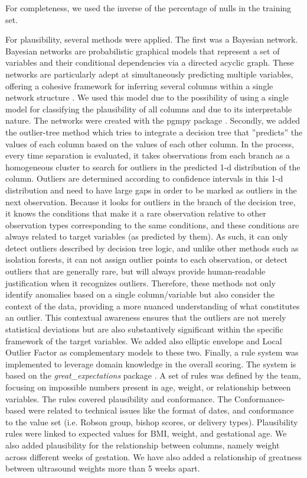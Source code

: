 For completeness, we used the inverse of the percentage of nulls in the training set. 

For plausibility, several methods were applied. The first was a Bayesian network. Bayesian networks are probabilistic graphical models that represent a set of variables and their conditional dependencies via a directed acyclic graph. These networks are particularly adept at simultaneously predicting multiple variables, offering a cohesive framework for inferring several columns within a single network structure \cite{pearl1988probabilistic}.
We used this model due to the possibility of using a single model for classifying the plausibility of all columns and due to its interpretable nature. The networks were created with the pgmpy package \cite{pgmpy}. Secondly, we added the outlier-tree method \cite{cortesExplainableOutlierDetection2020}which tries to integrate a decision tree that ”predicts” the values of each column based on the values of each other column. In the process, every time separation is evaluated, it takes observations from each branch as a homogeneous cluster to search for outliers in the predicted 1-d distribution of the column. Outliers are determined according to confidence intervals in this 1-d distribution and need to have large gaps in order to be marked as outliers in the next observation. Because it looks for outliers in the branch of the decision tree, it knows the conditions that make it a rare observation relative to other observation types corresponding to the same conditions, and these conditions are always related to target variables (as predicted by them). As such, it can only detect outliers described by decision tree logic, and unlike other methods such as isolation forests, it can not assign outlier points to each observation, or detect outliers that are generally rare, but will always provide human-readable justification when it recognizes outliers. Therefore, these methods not only identify anomalies based on a single column/variable but also consider the context of the data, providing a more nuanced understanding of what constitutes an outlier. This contextual awareness ensures that the outliers are not merely statistical deviations but are also substantively significant within the specific framework of the target variables. We added also elliptic envelope and Local Outlier Factor as complementary models to these two. Finally, a rule system was implemented to leverage domain knowledge in the overall scoring. The system is based on the \textit{great\_expectations} package \cite{GXProactiveCollaborative}. A set of rules was defined by the team, focusing on impossible numbers present in age, weight, or relationship between variables. The rules covered plausibility and conformance. The Conformance-based were related to technical issues like the format of dates, and conformance to the value set (i.e. Robson group, bishop scores, or delivery types). Plausibility rules were linked to expected values for BMI, weight, and gestational age. We also added plausibility for the relationship between columns, namely weight across different weeks of gestation. We have also added a relationship of greatness between ultrasound weights more than 5 weeks apart. 

